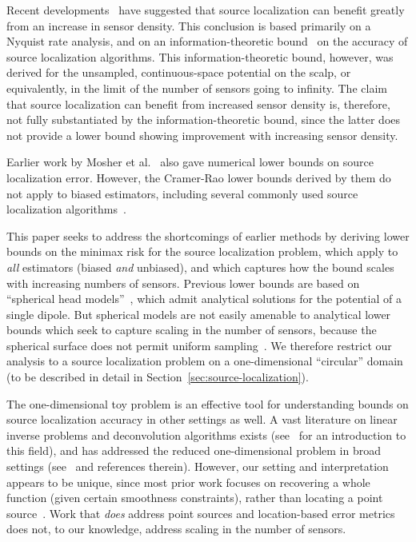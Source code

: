 \documentclass[conference]{IEEEtran}
\begin{document}
Recent developments~\cite{Grover2016Information} have suggested that source
localization can benefit greatly from an increase in sensor density. This
conclusion is based primarily on a Nyquist rate analysis, and on an
information-theoretic bound~\cite{Grover2016Fundamental} on the accuracy of
source localization algorithms. This information-theoretic bound, however, was
derived for the unsampled, continuous-space potential on the scalp, or
equivalently, in the limit of the number of sensors going to infinity. The
claim that source localization can benefit from increased sensor density is,
therefore, not fully substantiated by the information-theoretic bound, since
the latter does not provide a lower bound showing improvement with increasing
sensor density.

Earlier work by Mosher et al.~\cite{Mosher1993Error} also gave numerical lower
bounds on source localization error. However, the Cramer-Rao lower bounds
derived by them do not apply to biased estimators, including several commonly
used source localization
algorithms~\cite{Hamalainen1994Interpreting,Lin2006Assessing}.

This paper seeks to address the shortcomings of earlier methods by deriving
lower bounds on the minimax risk for the source localization problem, which
apply to \emph{all} estimators (biased \emph{and} unbiased), and which captures
how the bound scales with increasing numbers of sensors. Previous lower bounds
are based on ``spherical head
models''~\cite{Nunez2006Electric,Grover2016Information}, which admit analytical
solutions for the potential of a single dipole. But spherical models are not
easily amenable to analytical lower bounds which seek to capture scaling in the
number of sensors, because the spherical surface does not permit uniform
sampling~\cite{Heath1956Thirteen}. We therefore restrict our analysis to a
source localization problem on a one-dimensional ``circular'' domain (to be
described in detail in Section~\ref{sec:source-localization}).

The one-dimensional toy problem is an effective tool for understanding bounds
on source localization accuracy in other settings as well. A vast literature on
linear inverse problems and deconvolution algorithms exists
(see~\cite{Bal2012Introduction} for an introduction to this field), and has
addressed the reduced one-dimensional problem in broad settings
(see~\cite{Cavalier2002Sharp,Efromovich1997Robust,Ibragimov1981Statistical} and
references therein). However, our setting and interpretation appears to be
unique, since most prior work focuses on recovering a whole function (given
certain smoothness constraints), rather than locating a point
source~\cite{Cavalier2002Sharp}. Work that \emph{does} address point sources
and location-based error metrics~\cite[Ch.~7, Sec.~2]{Ibragimov1981Statistical}
does not, to our knowledge, address scaling in the number of sensors.
\end{document}
